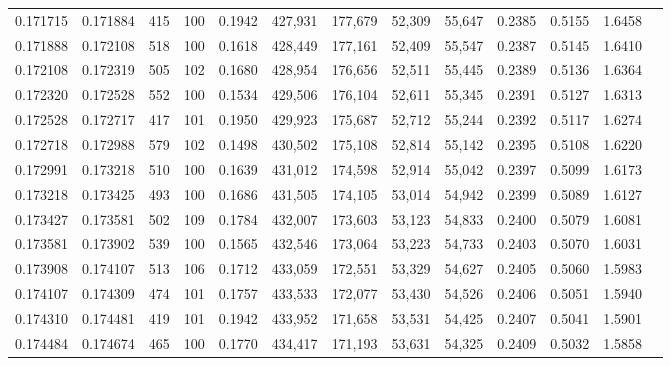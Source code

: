 \begin{tabular}{rrrrrrrrrrrrr}
0.171715 & 0.171884 &   415 & 100 &                                     0.1942 & 427,931 & 177,679 &  52,309 &  55,647 & 0.2385 & 0.5155 & 1.6458 \\
0.171888 & 0.172108 &   518 & 100 &                                     0.1618 & 428,449 & 177,161 &  52,409 &  55,547 & 0.2387 & 0.5145 & 1.6410 \\
0.172108 & 0.172319 &   505 & 102 &                                     0.1680 & 428,954 & 176,656 &  52,511 &  55,445 & 0.2389 & 0.5136 & 1.6364 \\
0.172320 & 0.172528 &   552 & 100 &                                     0.1534 & 429,506 & 176,104 &  52,611 &  55,345 & 0.2391 & 0.5127 & 1.6313 \\
0.172528 & 0.172717 &   417 & 101 &                                     0.1950 & 429,923 & 175,687 &  52,712 &  55,244 & 0.2392 & 0.5117 & 1.6274 \\
0.172718 & 0.172988 &   579 & 102 &                                     0.1498 & 430,502 & 175,108 &  52,814 &  55,142 & 0.2395 & 0.5108 & 1.6220 \\
0.172991 & 0.173218 &   510 & 100 &                                     0.1639 & 431,012 & 174,598 &  52,914 &  55,042 & 0.2397 & 0.5099 & 1.6173 \\
0.173218 & 0.173425 &   493 & 100 &                                     0.1686 & 431,505 & 174,105 &  53,014 &  54,942 & 0.2399 & 0.5089 & 1.6127 \\
0.173427 & 0.173581 &   502 & 109 &                                     0.1784 & 432,007 & 173,603 &  53,123 &  54,833 & 0.2400 & 0.5079 & 1.6081 \\
0.173581 & 0.173902 &   539 & 100 &                                     0.1565 & 432,546 & 173,064 &  53,223 &  54,733 & 0.2403 & 0.5070 & 1.6031 \\
0.173908 & 0.174107 &   513 & 106 &                                     0.1712 & 433,059 & 172,551 &  53,329 &  54,627 & 0.2405 & 0.5060 & 1.5983 \\
0.174107 & 0.174309 &   474 & 101 &                                     0.1757 & 433,533 & 172,077 &  53,430 &  54,526 & 0.2406 & 0.5051 & 1.5940 \\
0.174310 & 0.174481 &   419 & 101 &                                     0.1942 & 433,952 & 171,658 &  53,531 &  54,425 & 0.2407 & 0.5041 & 1.5901 \\
0.174484 & 0.174674 &   465 & 100 &                                     0.1770 & 434,417 & 171,193 &  53,631 &  54,325 & 0.2409 & 0.5032 & 1.5858 \\

\end{tabular}
